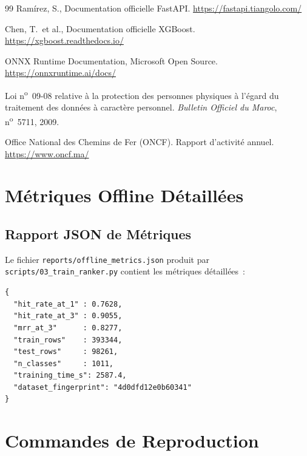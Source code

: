 \documentclass[12pt, a4paper]{report}
\begin{document}
\begin{thebibliography}{99}
    Ramírez, S., Documentation officielle FastAPI.
    \url{https://fastapi.tiangolo.com/}

    Chen, T.\ et al., Documentation officielle XGBoost.
    \url{https://xgboost.readthedocs.io/}

    ONNX Runtime Documentation, Microsoft Open Source.
    \url{https://onnxruntime.ai/docs/}

    Loi n\textsuperscript{o}~09-08 relative à la protection des personnes
    physiques à l'égard du traitement des données à caractère personnel.
    \textit{Bulletin Officiel du Maroc}, n\textsuperscript{o}~5711, 2009.

    Office National des Chemins de Fer (ONCF). Rapport d'activité annuel.
    \url{https://www.oncf.ma/}

\end{thebibliography}

\newpage
\appendix
\chapter{Métriques Offline Détaillées}

\section{Rapport JSON de Métriques}

Le fichier \texttt{reports/offline\_metrics.json} produit par
\texttt{scripts/03\_train\_ranker.py} contient les métriques détaillées~:

\begin{lstlisting}[style=json, caption={Extrait du rapport de m\'etriques offline}]
{
  "hit_rate_at_1" : 0.7628,
  "hit_rate_at_3" : 0.9055,
  "mrr_at_3"      : 0.8277,
  "train_rows"    : 393344,
  "test_rows"     : 98261,
  "n_classes"     : 1011,
  "training_time_s": 2587.4,
  "dataset_fingerprint": "4d0dfd12e0b60341"
}
\end{lstlisting}

\chapter{Commandes de Reproduction}
\end{document}
